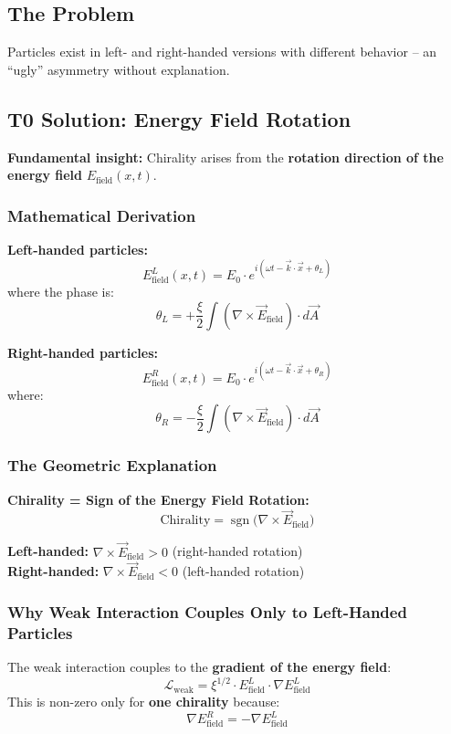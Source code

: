 	\subsection*{The Problem}
	Particles exist in left- and right-handed versions with different behavior – an ``ugly'' asymmetry without explanation.
	
	\subsection*{T0 Solution: Energy Field Rotation}
	
	\textbf{Fundamental insight:} Chirality arises from the \textbf{rotation direction of the energy field} $E_{\text{field}}(x,t)$.
	
	\subsubsection*{Mathematical Derivation}
	
	\textbf{Left-handed particles:}
	\[
	E_{\text{field}}^L(x,t) = E_0 \cdot e^{i(\omega t - \vec{k} \cdot \vec{x} + \theta_L)}
	\]
	where the phase is:
	\[
	\theta_L = +\frac{\xi}{2} \int (\nabla \times \vec{E}_{\text{field}}) \cdot d\vec{A}
	\]
	
	\textbf{Right-handed particles:}
	\[
	E_{\text{field}}^R(x,t) = E_0 \cdot e^{i(\omega t - \vec{k} \cdot \vec{x} + \theta_R)}
	\]
	where:
	\[
	\theta_R = -\frac{\xi}{2} \int (\nabla \times \vec{E}_{\text{field}}) \cdot d\vec{A}
	\]
	
	\subsubsection*{The Geometric Explanation}
	
	\textbf{Chirality = Sign of the Energy Field Rotation:}
	\[
	\boxed{\text{Chirality} = \operatorname{sgn}\bigl(\nabla \times \vec{E}_{\text{field}}\bigr)}
	\]
	
	\textbf{Left-handed:} $\nabla \times \vec{E}_{\text{field}} > 0$ (right-handed rotation) \\
	\textbf{Right-handed:} $\nabla \times \vec{E}_{\text{field}} < 0$ (left-handed rotation)
	
	\subsubsection*{Why Weak Interaction Couples Only to Left-Handed Particles}
	
	The weak interaction couples to the \textbf{gradient of the energy field}:
	\[
	\mathcal{L}_{\text{weak}} = \xi^{1/2} \cdot E_{\text{field}}^L \cdot \nabla E_{\text{field}}^L
	\]
	This is non-zero only for \textbf{one chirality} because:
	\[
	\nabla E_{\text{field}}^R = -\nabla E_{\text{field}}^L
	\]
	
